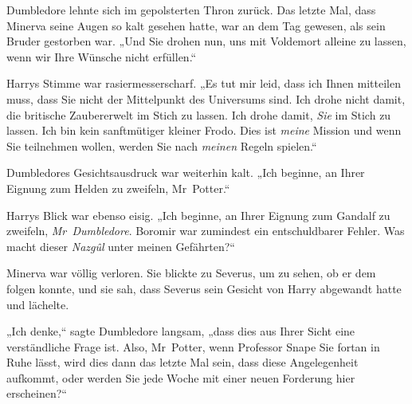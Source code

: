 Dumbledore lehnte sich im gepolsterten Thron zurück. Das letzte Mal, dass Minerva seine Augen so kalt gesehen hatte, war an dem Tag gewesen, als sein Bruder gestorben war. „Und Sie drohen nun, uns mit Voldemort alleine zu lassen, wenn wir Ihre Wünsche nicht erfüllen.“

Harrys Stimme war rasiermesserscharf. „Es tut mir leid, dass ich Ihnen mitteilen muss, dass Sie nicht der Mittelpunkt des Universums sind. Ich drohe nicht damit, die britische Zaubererwelt im Stich zu lassen. Ich drohe damit, \emph{Sie} im Stich zu lassen. Ich bin kein sanftmütiger kleiner Frodo. Dies ist \emph{meine} Mission und wenn Sie teilnehmen wollen, werden Sie nach \emph{meinen} Regeln spielen.“

Dumbledores Gesichtsausdruck war weiterhin kalt. „Ich beginne, an Ihrer Eignung zum Helden zu zweifeln, Mr~Potter.“

Harrys Blick war ebenso eisig. „Ich beginne, an Ihrer Eignung zum Gandalf zu zweifeln, \emph{Mr~Dumbledore}. Boromir war zumindest ein entschuldbarer Fehler. Was macht dieser \emph{Nazgûl} unter meinen Gefährten?“

Minerva war völlig verloren. Sie blickte zu Severus, um zu sehen, ob er dem folgen konnte, und sie sah, dass Severus sein Gesicht von Harry abgewandt hatte und lächelte.

„Ich denke,“ sagte Dumbledore langsam, „dass dies aus Ihrer Sicht eine verständliche Frage ist. Also, Mr~Potter, wenn Professor Snape Sie fortan in Ruhe lässt, wird dies dann das letzte Mal sein, dass diese Angelegenheit aufkommt, oder werden Sie jede Woche mit einer neuen Forderung hier erscheinen?“

